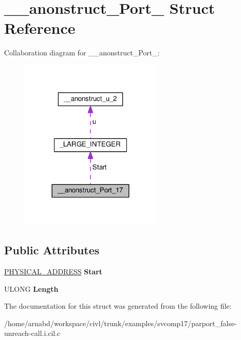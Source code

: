 \hypertarget{struct____anonstruct__Port__17}{}\section{\+\_\+\+\_\+anonstruct\+\_\+\+Port\+\_ Struct Reference}
\label{struct____anonstruct__Port__17}


Collaboration diagram for \+\_\+\+\_\+anonstruct\+\_\+\+Port\+\_\+:
\nopagebreak
\begin{figure}[H]
\begin{center}
\leavevmode
\includegraphics[width=192pt]{struct____anonstruct__Port__17__coll__graph}
\end{center}
\end{figure}
\subsection*{Public Attributes}
\begin{DoxyCompactItemize}
\item 
\hypertarget{struct____anonstruct__Port__17_a4c0251289c50a12a4d0831802acd10c7}{}\hyperlink{union__LARGE__INTEGER}{P\+H\+Y\+S\+I\+C\+A\+L\+\_\+\+A\+D\+D\+R\+E\+S\+S} {\bfseries Start}\label{struct____anonstruct__Port__17_a4c0251289c50a12a4d0831802acd10c7}

\item 
\hypertarget{struct____anonstruct__Port__17_abc8e7c2597ec44ad0998238f5a6752d7}{}U\+L\+O\+N\+G {\bfseries Length}\label{struct____anonstruct__Port__17_abc8e7c2597ec44ad0998238f5a6752d7}

\end{DoxyCompactItemize}


The documentation for this struct was generated from the following file\+:\begin{DoxyCompactItemize}
\item 
/home/arnabd/workspace/civl/trunk/examples/svcomp17/parport\+\_\+false-\/unreach-\/call.\+i.\+cil.\+c\end{DoxyCompactItemize}
